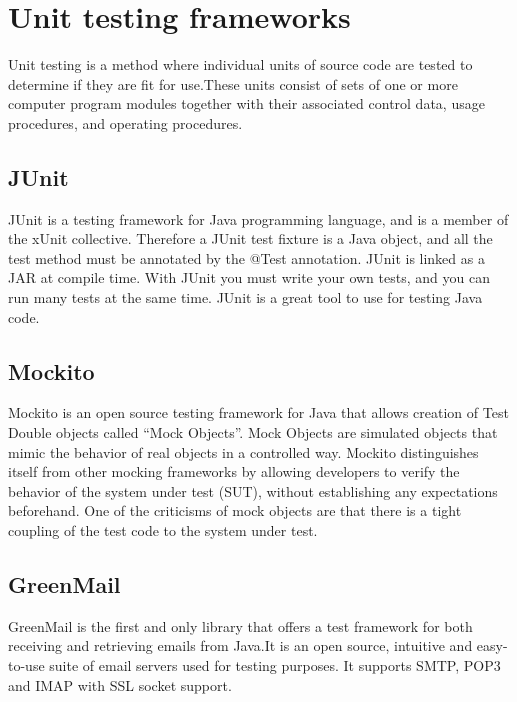 \section{Unit testing frameworks}

Unit testing is a method where individual units of source code are tested to determine if they are fit for use.These units consist of sets of one or more computer program modules together with their associated control data, usage procedures, and operating procedures\cite{bib:kolawa}.

\subsection{JUnit}
JUnit is a testing framework for Java programming language, and is a member of the xUnit collective. Therefore a JUnit test fixture is a Java object, and all the test method must be annotated by the @Test annotation. JUnit is linked as a JAR at compile time. With JUnit you must write your own tests, and you can run many tests at the same time. JUnit is a great tool to use for testing Java code\cite{bib:junit}.

\subsection{Mockito}
Mockito is an open source testing framework for Java that allows creation of Test Double objects called “Mock Objects”. Mock Objects are simulated objects that mimic the behavior of real objects in a controlled way\cite{bib:mock}.
\newline
\newline
Mockito distinguishes itself from other mocking frameworks by allowing developers to verify the behavior of the system under test (SUT), without establishing any expectations beforehand\cite{bib:mockito}.
One of the criticisms of mock objects are that there is a tight coupling of the test code to the system under test\cite{mocks}.

\subsection{GreenMail}
GreenMail is the first and only library that offers a test framework for both receiving and retrieving emails from Java.It is an open source, intuitive and easy-to-use suite of email servers used for testing purposes. It supports SMTP, POP3 and IMAP with SSL socket support\cite{bib:greenmail}.

